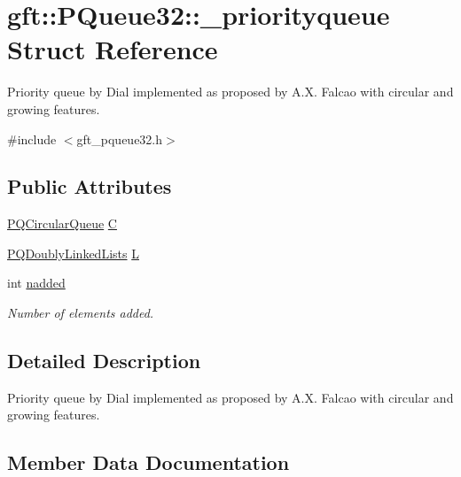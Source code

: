 \hypertarget{structgft_1_1PQueue32_1_1__priorityqueue}{}\section{gft\+:\+:P\+Queue32\+:\+:\+\_\+priorityqueue Struct Reference}
\label{structgft_1_1PQueue32_1_1__priorityqueue}


Priority queue by Dial implemented as proposed by A.\+X. Falcao with circular and growing features.  




{\ttfamily \#include $<$gft\+\_\+pqueue32.\+h$>$}

\subsection*{Public Attributes}
\begin{DoxyCompactItemize}
\item 
\hyperlink{namespacegft_1_1PQueue32_aefaf7157b45d644a8eed22d16d5ae865}{P\+Q\+Circular\+Queue} \hyperlink{structgft_1_1PQueue32_1_1__priorityqueue_a6d54b970bf65337bb5b50b9e93b8af2c}{C}
\item 
\hyperlink{namespacegft_1_1PQueue32_a0f1b06428dba7567e75fedd80ecadc05}{P\+Q\+Doubly\+Linked\+Lists} \hyperlink{structgft_1_1PQueue32_1_1__priorityqueue_a52881ee4fa383a2c8a237ebdc03a4c21}{L}
\item 
int \hyperlink{structgft_1_1PQueue32_1_1__priorityqueue_af5c8ac0e0628e1ebf95693aa7e2a40a3}{nadded}
\begin{DoxyCompactList}\small\item\em Number of elements added. \end{DoxyCompactList}\end{DoxyCompactItemize}


\subsection{Detailed Description}
Priority queue by Dial implemented as proposed by A.\+X. Falcao with circular and growing features. 

\subsection{Member Data Documentation}
